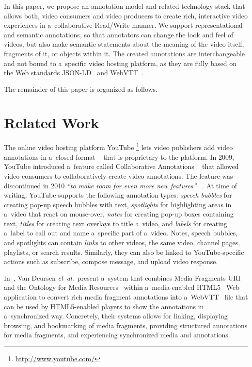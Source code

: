 \documentclass{sig-alternate}
\newcommand{\inlinelistingsize}{\fontsize{8pt}{11pt}}
\let\oldurl\url
\renewcommand{\url}[1]{\inlinelistingsize\oldurl{#1}}
\newcommand{\todo}[1]{\fcolorbox{blue}{white}{\parbox{7cm}{\color{blue}{#1}}}}
\begin{document}
In this paper, we propose an annotation model
and related technology stack that allows both,
video consumers and video producers to create 
rich, interactive video experiences
in a~collaborative Read/Write manner.
We support representational and semantic annotations,
so that annotators can change
the look and feel of videos,
but also make semantic statements
about the meaning of the video itself, fragments of it,
or objects within it.
The created annotations are interchangeable
and not bound to a~specific video hosting platform,
as they are fully based on the Web standards
JSON-LD~\cite{sporny2013jsonld}
and WebVTT~\cite{pfeiffer2013webvtt}.

The remainder of this paper is organized as follows.
\todo{Describe paper structure}

\section{Related Work}

The online video hosting platform YouTube%
\footnote{\url{http://www.youtube.com/}}
lets video publishers add video annotations
in a~closed format%
~\cite{youtube2008annotations,youtube2010annotations}
that is proprietary to the platform.
In 2009, YouTube introduced a~feature called 
Collaborative Annotations%
~\cite{fink2009collaborativeannotations}
that allowed video consumers to collaboratively
create video annotations.
The feature was discontinued in 2010
\textit{``to make room for even more new features''}%
~\cite{youtube2010annotations}.
At time of writing, YouTube supports the following
annotation types: \emph{speech bubbles} for creating
pop-up speech bubbles with text,
\emph{spotlights} for highlighting areas in a~video
that react on mouse-over,
\emph{notes} for creating pop-up boxes containing text,
\emph{titles} for creating text overlays to title a~video,
and \emph{labels} for creating a~label to call out
and name a~specific part of a~video.
Notes, speech bubbles, and spotlights can contain \emph{links}
to other videos, the same video, channel pages, playlists,
or search results.
Similarly, they can also be linked to YouTube-specific actions
such as subscribe, compose message, and upload video response.
 
In~\cite{vandeursen2012mediafragmentannotations},
Van Deursen \emph{et~al.}\ present a~system
that combines Media Fragments URI~\cite{troncy2012mediafragments} and the Ontology for Media Resources~\cite{lee2012mediaontology}
within a~media-enabled HTML5~\cite{berjon2013html5}
Web application to convert rich media fragment annotations
into a~WebVTT~\cite{pfeiffer2013webvtt} file
that can be used by HTML5-enabled players
to show the annotations in a~synchronized way.
Concretely, their systems allows for linking, displaying
browsing, and bookmarking of media fragments,
providing structured annotations for media fragments,
and experiencing synchronized media and annotations.
\end{document}
